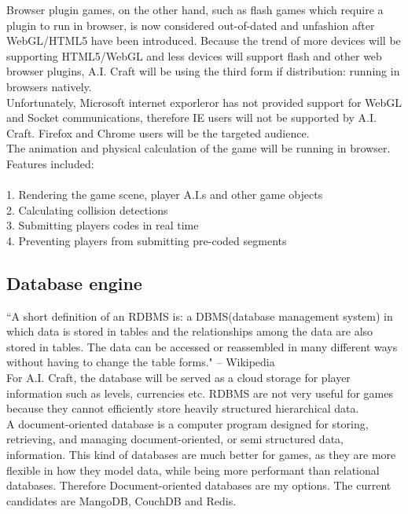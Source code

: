 \documentclass[12pt]{article}
\begin{document}
Browser plugin games, on the other hand, such as flash games which require a plugin to run in browser, is now considered out-of-dated and unfashion after WebGL/HTML5 have been introduced. Because the trend of more devices will be supporting HTML5/WebGL and less devices will support flash and other web browser plugins, A.I. Craft will be using the third form if distribution: running in browsers natively.\\ 

Unfortunately, Microsoft internet exporleror has not provided support for WebGL and Socket communications, therefore IE users will not be supported by A.I. Craft. Firefox and Chrome users will be the targeted audience.\\


The animation and physical calculation of the game will be running in browser. Features included:\\
\\
1. Rendering the game scene, player A.I.s and other game objects\\
2. Calculating collision detections\\
3. Submitting players codes in real time\\
4. Preventing players from submitting pre-coded segments\\

\subsection{Database engine}
``A short definition of an RDBMS is: a DBMS(database management system) in which data is stored in tables and the relationships among the data are also stored in tables. The data can be accessed or reassembled in many different ways without having to change the table forms." -- Wikipedia\\

For A.I. Craft, the database will be served as a cloud storage for player information such as levels, currencies etc. RDBMS are not very useful for games because they cannot efficiently store heavily structured hierarchical data\cite{ari}.\\ 

A document-oriented database is a computer program designed for storing, retrieving, and managing document-oriented, or semi structured data, information. This kind of databases are much better for games, as they are more flexible in how they model data, while being more performant than relational databases\cite{michael10}. Therefore Document-oriented databases are my options. The current candidates are MangoDB, CouchDB and Redis.\\
\end{document}
